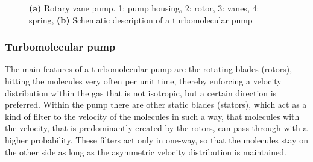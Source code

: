 \documentclass[a4paper]{scrartcl}
\numberwithin{equation}{section}
\numberwithin{figure}{section}
\numberwithin{table}{section}
\begin{document}
\begin{figure} 
 \centering
{}
 \hfill
{}
\caption{
\small \textbf{(a)} Rotary vane pump. 1: pump housing, 2: rotor, 3: vanes, 4: spring,  \textbf{(b)} Schematic description of a turbomolecular pump } 
	\label{fig:pump}
\end{figure}






\subsubsection{Turbomolecular pump}
The main features of a turbomolecular pump are the rotating blades (rotors), hitting the molecules very often per unit time, thereby enforcing a velocity distribution within the gas that is not isotropic, but a certain direction is preferred. Within the pump there are other static blades (stators), which act as a kind of filter to the velocity of the molecules in such a way, that molecules with the velocity, that is predominantly created by the rotors, can pass through with a higher probability. These filters act only in one-way, so that the molecules stay on the other side as long as the asymmetric velocity distribution is maintained. 
\end{document}
